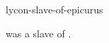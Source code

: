 \documentclass{stex}
\begin{document}
\begin{smodule}{lycon-slave-of-epicurus}
\begin{sparagraph}[style=symdoc]
 was a slave of .
\end{sparagraph}
\end{smodule}
\end{document}
